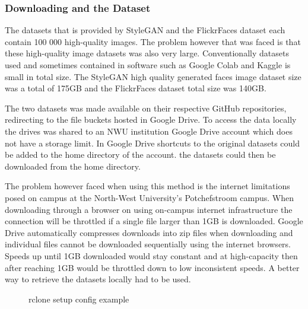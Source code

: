 \subsubsection{Downloading and the Dataset}

The datasets that is provided by StyleGAN and the FlickrFaces dataset each contain 100 000 high-quality images. The problem however that was faced is that these high-quality image datasets was also very large. Conventionally datasets used and sometimes contained in software such as Google Colab and Kaggle is small in total size. The StyleGAN high quality generated faces image dataset size was a total of 175GB and the FlickrFaces dataset total size was 140GB. 

The two datasets was made available on their respective GitHub repositories, redirecting to the file buckets hosted in Google Drive. To access the data locally the drives was shared to an NWU institution Google Drive account which does not have a storage limit. In Google Drive shortcuts to the original datasets could be added to the home directory of the account. the datasets could then be downloaded from the home directory.

The problem however faced when using this method is the internet limitations posed on campus at the North-West University's Potchefstroom campus. When downloading through a browser on using on-campus internet infrastructure the connection will be throttled if a single file larger than 1GB is downloaded. Google Drive automatically compresses downloads into zip files when downloading and individual files cannot be downloaded sequentially using the internet browsers. Speeds up until 1GB downloaded would stay constant and at high-capacity then after reaching 1GB would be throttled down to low inconsistent speeds. A better way to retrieve the datasets locally had to be used.

\begin{figure}[H]%
\centering
{}%
\caption{rclone setup config example \citep{rclone2021}}%
\label{fig:10}%
\end{figure}

